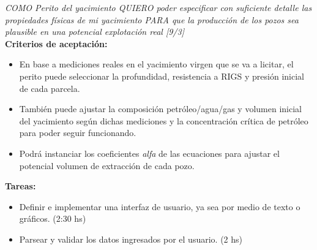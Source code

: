 \begin{tcolorbox}
\textit{ COMO Perito del yacimiento QUIERO poder especificar con suficiente detalle las propiedades físicas de mi yacimiento PARA que la producción de los pozos sea plausible en una potencial explotación real [9/3]}\\

\textbf{Criterios de aceptación:}
\begin{itemize}
	\item En base a mediciones reales en el yacimiento virgen que se va a licitar, el perito puede seleccionar la profundidad, resistencia a RIGS y presión inicial de cada parcela.

    \item También puede ajustar la composición petróleo/agua/gas y volumen inicial del yacimiento según dichas mediciones y la concentración crítica de petróleo para poder seguir funcionando.

    \item Podrá instanciar los coeficientes \textit{alfa} de las ecuaciones para ajustar el potencial volumen de extracción de cada pozo.
\end{itemize}

\textbf{Tareas:}
\begin{itemize}
	\item Definir e implementar una interfaz de usuario, ya sea por medio de texto o gráficos. (2:30 hs)
    \item Parsear y validar los datos ingresados por el usuario. (2 hs)
\end{itemize}
\end{tcolorbox}
